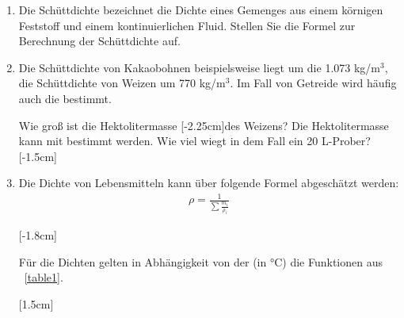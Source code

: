 \documentclass[a4paper,11pt]{article}
\newif\ifshowme
\begin{document}
\begin{enumerate}[leftmargin=6mm,font={\bfseries \sffamily \color{uniblau!75!black}},label=\alph*)]
\item Die Schüttdichte bezeichnet die Dichte eines Gemenges aus einem körnigen Feststoff und einem kontinuierlichen Fluid. Stellen Sie die Formel zur Berechnung der Schüttdichte auf.
\ifshowme
\antwort{
\vspace*{-4mm}
\begin{align*}
{\mathlarger \rho}_{Sch} &= \frac{m}{V_{Sch}}
\end{align*}
}
\else
\fi



\item Die Schüttdichte von Kakaobohnen beispielsweise liegt um die 1.073 kg/m$^3$, die Schüttdichte von Weizen um 770 kg/m$^3$. Im Fall von Getreide wird häufig auch die  bestimmt. 

Wie groß ist die Hektolitermasse [-2.25cm]des Weizens? Die Hektolitermasse kann mit  bestimmt werden. Wie viel wiegt in dem Fall ein 20 L-Prober?
[-1.5cm]
\ifshowme
\antwort{
\vspace*{-4mm}
\begin{align*}
770 ~\text{kg/m}^3 = 77 ~\text{kg/hL}\\
0,77~\text{kg/L} \cdot 20~\text{L} = 15,4 ~\text{kg}
\end{align*}
}
\pagebreak
\else
\pagebreak
\fi


\item Die Dichte von Lebensmitteln kann über folgende Formel abgeschätzt werden:
\begin{align}
\rho = \frac{1}{\sum \frac{m_i}{\rho_i}}
\end{align}

[-1.8cm]

Für die Dichten gelten in Abhängigkeit von der  (in °C) die Funktionen aus \tablename{~\ref{table1}}.
\ppbig

[1.5cm]



\end{enumerate}
\end{document}
